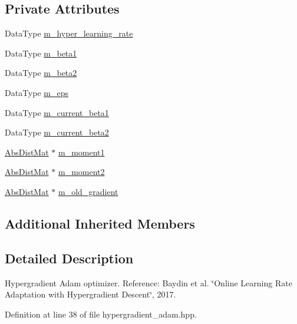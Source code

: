 \subsection*{Private Attributes}
\begin{DoxyCompactItemize}
\item 
Data\+Type \hyperlink{classlbann_1_1hypergradient__adam_a1066721ebaadb4eed2554b159510ae44}{m\+\_\+hyper\+\_\+learning\+\_\+rate}
\item 
Data\+Type \hyperlink{classlbann_1_1hypergradient__adam_a876a8bc1ee9a47479008d204048724e7}{m\+\_\+beta1}
\item 
Data\+Type \hyperlink{classlbann_1_1hypergradient__adam_a0effe7359fa37f02a40f059281580760}{m\+\_\+beta2}
\item 
Data\+Type \hyperlink{classlbann_1_1hypergradient__adam_a5bae9101fcc235d961ae7713706f4ff7}{m\+\_\+eps}
\item 
Data\+Type \hyperlink{classlbann_1_1hypergradient__adam_a671c622860c712ef9716c2c8c6714780}{m\+\_\+current\+\_\+beta1}
\item 
Data\+Type \hyperlink{classlbann_1_1hypergradient__adam_a2d8b00faecbf4ce3996f879566ca4064}{m\+\_\+current\+\_\+beta2}
\item 
\hyperlink{base_8hpp_a9a697a504ae84010e7439ffec862b470}{Abs\+Dist\+Mat} $\ast$ \hyperlink{classlbann_1_1hypergradient__adam_a529f3b53732247ebfb649f55f1fae4d6}{m\+\_\+moment1}
\item 
\hyperlink{base_8hpp_a9a697a504ae84010e7439ffec862b470}{Abs\+Dist\+Mat} $\ast$ \hyperlink{classlbann_1_1hypergradient__adam_a73b77fb79bd8e9bbfc8f360197899d18}{m\+\_\+moment2}
\item 
\hyperlink{base_8hpp_a9a697a504ae84010e7439ffec862b470}{Abs\+Dist\+Mat} $\ast$ \hyperlink{classlbann_1_1hypergradient__adam_a2e52355f77edf55bdac8a3eed79f44c4}{m\+\_\+old\+\_\+gradient}
\end{DoxyCompactItemize}
\subsection*{Additional Inherited Members}


\subsection{Detailed Description}
Hypergradient Adam optimizer. Reference\+: Baydin et al. \char`\"{}\+Online Learning Rate Adaptation with Hypergradient Descent\char`\"{}, 2017. 

Definition at line 38 of file hypergradient\+\_\+adam.\+hpp.



